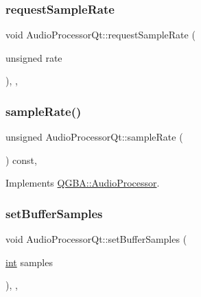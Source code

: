 \subsubsection{\texorpdfstring{request\+Sample\+Rate}{requestSampleRate}}
{\footnotesize\ttfamily void Audio\+Processor\+Qt\+::request\+Sample\+Rate (\begin{DoxyParamCaption}\item[{unsigned}]{rate }\end{DoxyParamCaption})\hspace{0.3cm}{\ttfamily [override]}, {\ttfamily [virtual]}, {\ttfamily [slot]}}

\mbox{\label{class_q_g_b_a_1_1_audio_processor_qt_afe2bf3efb15330553d552a62265061ba}} 
\subsubsection{\texorpdfstring{sample\+Rate()}{sampleRate()}}
{\footnotesize\ttfamily unsigned Audio\+Processor\+Qt\+::sample\+Rate (\begin{DoxyParamCaption}{ }\end{DoxyParamCaption}) const\hspace{0.3cm}{\ttfamily [override]}, {\ttfamily [virtual]}}



Implements \mbox{\hyperlink{class_q_g_b_a_1_1_audio_processor_af9fcd827f2447cca613deb3bbe50a1de}{Q\+G\+B\+A\+::\+Audio\+Processor}}.

\mbox{\label{class_q_g_b_a_1_1_audio_processor_qt_a19485cf3431ff7d1617161883ce43e1d}} 
\subsubsection{\texorpdfstring{set\+Buffer\+Samples}{setBufferSamples}}
{\footnotesize\ttfamily void Audio\+Processor\+Qt\+::set\+Buffer\+Samples (\begin{DoxyParamCaption}\item[{\mbox{\hyperlink{ioapi_8h_a787fa3cf048117ba7123753c1e74fcd6}{int}}}]{samples }\end{DoxyParamCaption})\hspace{0.3cm}{\ttfamily [override]}, {\ttfamily [virtual]}, {\ttfamily [slot]}}

